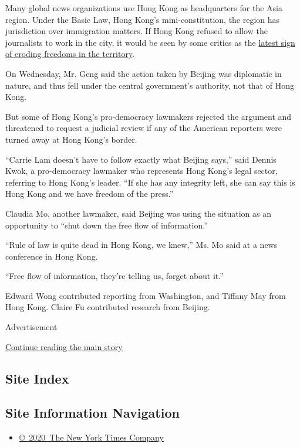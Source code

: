 Many global news organizations use Hong Kong as headquarters for the
Asia region. Under the Basic Law, Hong Kong's mini-constitution, the
region has jurisdiction over immigration matters. If Hong Kong refused
to allow the journalists to work in the city, it would be seen by some
critics as the
\href{https://www.nytimes.com/2018/10/08/world/asia/victor-mallet-hong-kong-financial-times.html}{latest
sign of eroding freedoms in the territory}.

On Wednesday, Mr. Geng said the action taken by Beijing was diplomatic
in nature, and thus fell under the central government's authority, not
that of Hong Kong.

But some of Hong Kong's pro-democracy lawmakers rejected the argument
and threatened to request a judicial review if any of the American
reporters were turned away at Hong Kong's border.

``Carrie Lam doesn't have to follow exactly what Beijing says,'' said
Dennis Kwok, a pro-democracy lawmaker who represents Hong Kong's legal
sector, referring to Hong Kong's leader. ``If she has any integrity
left, she can say this is Hong Kong and we have freedom of the press.''

Claudia Mo, another lawmaker, said Beijing was using the situation as an
opportunity to ``shut down the free flow of information.''

``Rule of law is quite dead in Hong Kong, we knew,'' Ms. Mo said at a
news conference in Hong Kong.

``Free flow of information, they're telling us, forget about it.''

Edward Wong contributed reporting from Washington, and Tiffany May from
Hong Kong. Claire Fu contributed research from Beijing.

Advertisement

\protect\hyperlink{after-bottom}{Continue reading the main story}

\hypertarget{site-index}{%
\subsection{Site Index}\label{site-index}}

\hypertarget{site-information-navigation}{%
\subsection{Site Information
Navigation}\label{site-information-navigation}}

\begin{itemize}
\tightlist
\item
  \href{https://help.nytimes.com/hc/en-us/articles/115014792127-Copyright-notice}{©~2020~The
  New York Times Company}
\end{itemize}

